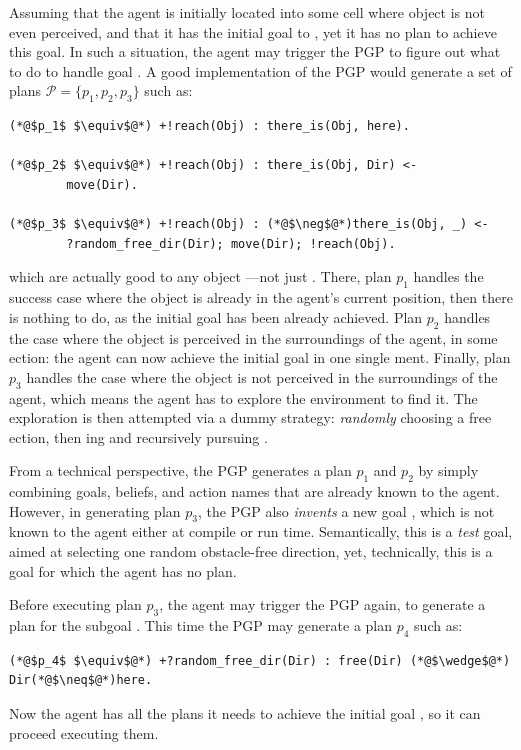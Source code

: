 Assuming that the agent is initially located into some cell where object  is not even perceived,
and that it has the initial goal to ,
yet it has no plan to achieve this goal.
%
In such a situation,
the agent may trigger the \ac{PGP} to figure out what to do to handle goal .
%
A good implementation of the \ac{PGP} would generate a set of plans $\mathcal{P} = \{p_1, p_2, p_3\}$ such as:
%
\begin{lstlisting}
(*@$p_1$ $\equiv$@*) +!reach(Obj) : there_is(Obj, here).

(*@$p_2$ $\equiv$@*) +!reach(Obj) : there_is(Obj, Dir) <-
        move(Dir).

(*@$p_3$ $\equiv$@*) +!reach(Obj) : (*@$\neg$@*)there_is(Obj, _) <-
        ?random_free_dir(Dir); move(Dir); !reach(Obj).
\end{lstlisting}
%
which are actually good to  any object %
---not just .
%
There,
plan $p_1$ handles the success case where the object  is already in the agent's current position,
then there is nothing to do,
as the initial goal has been already achieved.
%
Plan $p_2$ handles the case where the object is perceived in the surroundings of the agent,
in some ection:
the agent can now achieve the initial goal in one single ment.
%
Finally,
plan $p_3$ handles the case where the object is not perceived in the surroundings of the agent,
which means the agent has to explore the environment to find it.
%
The exploration is then attempted via a dummy strategy:
\emph{randomly} choosing a free ection,
then ing and recursively pursuing .

From a technical perspective,
the \ac{PGP} generates a plan $p_1$ and $p_2$ by simply combining
goals, beliefs, and action names that are already known to the agent.
%
However,
in generating plan $p_3$,
the \ac{PGP} also \emph{invents} a new goal ,
which is not known to the agent either at compile or run time.
%
Semantically,
this is a \emph{test} goal,
aimed at selecting one random obstacle-free direction,
yet,
technically,
this is a goal for which the agent has no plan.

Before executing plan $p_3$,
the agent may trigger the \ac{PGP} again,
to generate a plan for the subgoal .
%
This time the \ac{PGP} may generate a plan $p_4$ such as:
%
\begin{lstlisting}
(*@$p_4$ $\equiv$@*) +?random_free_dir(Dir) : free(Dir) (*@$\wedge$@*) Dir(*@$\neq$@*)here.
\end{lstlisting}
%
Now the agent has all the plans it needs to achieve the initial goal ,
so it can proceed executing them.

